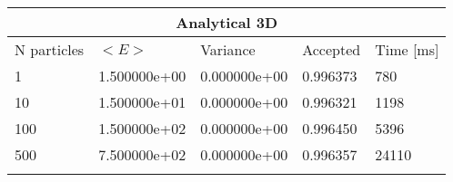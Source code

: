 \begin{tabular}{|l|l|l|l|l|}
\hline 
\multicolumn{5}{|c|}{Analytical 3D}\\ 
\hline 
N particles & $<E>$ & Variance & Accepted & Time [ms]\\ 
 \hline 
1 & 1.500000e+00 & 0.000000e+00 & 0.996373 & 780 \\ \hline 
10 & 1.500000e+01 & 0.000000e+00 & 0.996321 & 1198 \\ \hline 
100 & 1.500000e+02 & 0.000000e+00 & 0.996450 & 5396 \\ \hline 
500 & 7.500000e+02 & 0.000000e+00 & 0.996357 & 24110 \\ \hline 
\label{i:a3} 
\end{tabular}